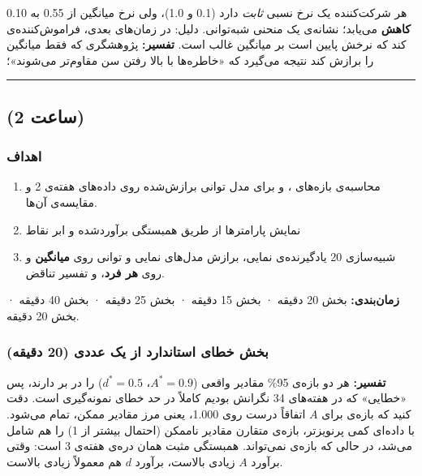 هر شرکت‌کننده یک نرخ نسبی \emph{ثابت} دارد (0.1 و 1.0)، ولی نرخ میانگین
از 0.55 به 0.10 \textbf{کاهش} می‌یابد؛ نشانه‌ی یک منحنی شبه‌توانی. دلیل: در
زمان‌های بعدی، فراموش‌کننده‌ی کند که نرخش پایین است بر میانگین غالب است.
\textbf{تفسیر:} پژوهشگری که فقط میانگین را برازش کند نتیجه می‌گیرد که
«خاطره‌ها با بالا رفتن سن مقاوم‌تر می‌شوند»؛

\begin{center}\rule{0.5\linewidth}{0.5pt}\end{center}


\subsection{\texorpdfstring{ (2 ساعت)}{lab (2 ساعت)}}

\subsubsection{اهداف}

\begin{enumerate}
\def\labelenumi{\arabic{enumi}.}
\tightlist
\item
  محاسبه‌ی بازه‌های ،  و  برای مدل
  توانی برازش‌شده روی داده‌های هفته‌ی 2 و مقایسه‌ی آن‌ها.
\item
  نمایش  پارامترها از طریق همبستگی برآوردشده و ابر نقاط
\item
  شبیه‌سازی 20 یادگیرنده‌ی نمایی، برازش مدل‌های نمایی و توانی روی
  \textbf{میانگین} و روی \textbf{هر فرد}، و تفسیر تناقض.
\end{enumerate}

\textbf{زمان‌بندی:} بخش  20 دقیقه · بخش  15 دقیقه · بخش
 25 دقیقه · بخش  40 دقیقه · بخش  20 دقیقه.

\subsubsection{\texorpdfstring{بخش  خطای استاندارد  از
یک  عددی (20
دقیقه)}{بخش A: خطای استاندارد Wald از یک Hessian عددی (20 دقیقه)}}

\textbf{تفسیر:} هر دو بازه‌ی 95\% مقادیر واقعی (\(A^\ast = 0.9\)،
\(d^\ast = 0.5\)) را در بر دارند، پس «خطایی» که در هفته‌های 3\lr{--}4 نگرانش
بودیم کاملاً در حد خطای نمونه‌گیری است. دقت کنید که بازه‌ی  برای
\(A\) اتفاقاً درست روی 1.000، یعنی مرز مقادیر ممکن، تمام می‌شود. با داده‌ای
کمی پرنویزتر، بازه‌ی متقارن  مقادیر ناممکن (احتمال بیشتر از 1)
را هم شامل می‌شد، در حالی که بازه‌ی  نمی‌تواند. همبستگی مثبت
همان دره‌ی  هفته‌ی 3 است: وقتی برآورد \(A\) زیادی بالاست،
برآورد \(d\) هم معمولاً زیادی بالاست.

